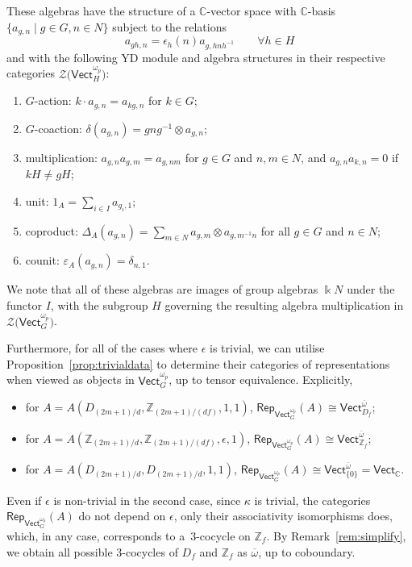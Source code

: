 \documentclass[10pt,a4paper]{amsart}
\numberwithin{equation}{section}
\newcommand{\ov}[1]{\overline{#1}}
\newcommand{\Rep}{\mathsf{Rep}}
\newcommand{\Vect}{\mathsf{Vect}}
\newcommand{\mC}{\mathbb{C}}
\newcommand{\mZ}{\mathbb{Z}}
\newcommand{\cZ}{\mathcal{Z}}
\begin{document}
These algebras have the structure of
 a $\mC$-vector space with $\mC$-basis ${\lbrace a_{g,n} \mid g \in G, \allowbreak n \in N\rbrace}$ subject to the relations
 \[a_{gh,n} = \epsilon_h(n) a_{g,hnh^{-1}} \qquad \forall h\in H\]
 and with
the following YD module and algebra structures in their respective categories $\cZ\big(\Vect^{\omega_p}_H\big)$:
 \begin{enumerate}\itemsep=0pt
 \item[$(i)$] $G$-action: $k \cdot a_{g,n}=a_{kg,n}$ for $k\in G$;
 \item[$(ii)$] $G$-coaction: $\delta(a_{g,n})=gng^{-1} \otimes a_{g,n}$;
 \item[$(iii)$] multiplication: $a_{g,n} a_{g,m} = a_{g,nm}$ for $g \in G$ and $ n,m\in N$, and $a_{g,n}a_{k,n} =0$ if $kH\neq gH$;
 \item[$(iv)$] unit: $1_A =\sum_{i\in I}a_{g_i,1}$;
 \item[$(v)$] coproduct: $\Delta_A (a_{g,n}) = \sum_{m\in N}a_{g,m}\otimes a_{g,m^{-1}n}$ for all $g\in G$ and $n\in N$;
 \item[$(vi)$] counit:
 $\varepsilon_A(a_{g,n}) = \delta_{n,1}.$
 \end{enumerate}
 We note that all of these algebras are images of group algebras $\Bbbk N$ under the functor $I$, with the subgroup $H$ governing the resulting algebra multiplication in $\cZ\big(\Vect_G^{\omega_p}\big)$.

Furthermore, for all of the cases where $\epsilon$ is trivial, we can utilise Proposition~\ref{prop:trivialdata} to determine their categories of representations when viewed as objects in $\Vect_G^{\omega_p}$, up to tensor equivalence. Explicitly,
\begin{itemize}\itemsep=0pt
 \item for $A=A(D_{(2m+1)/d},\mZ_{(2m+1)/(df)},1,1)$, $\Rep_{\Vect_G^{\omega_p}}(A) \cong \Vect^{\ov{\omega}}_{D_f}$;
 \item for $A=A(\mZ_{(2m+1)/d},\mZ_{(2m+1)/(df)},\epsilon,1)$, $\Rep_{\Vect_G^{\omega_p}}(A) \cong \Vect^{\ov{\omega}}_{\mZ_f}$;
 \item for $A=A(D_{(2m+1)/d},D_{(2m+1)/d},1,1)$, $\Rep_{\Vect_G^{\omega_p}}(A) \cong \Vect^{\ov{\omega}}_{\lbrace 0\rbrace} = \Vect_\mC$.
\end{itemize}
 Even if $\epsilon$ is non-trivial in the second case, since $\kappa$ is trivial, the categories
 $\Rep_{\Vect_G^{\omega_p}}(A)$ do not depend on $\epsilon$, only their associativity isomorphisms does, which, in any case, corresponds to a~$3$-cocycle on $\mZ_f$. By Remark~\ref{rem:simplify}, we obtain all possible $3$-cocycles of $D_f$ and $\mZ_f$ as $\ov{\omega}$, up to coboundary.
\end{document}
